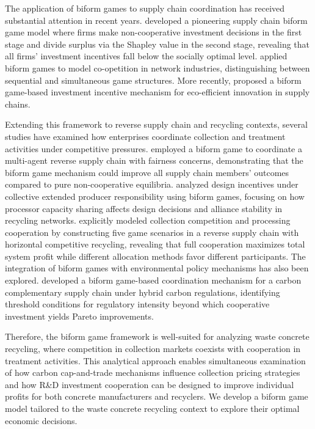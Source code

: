 \documentclass[authoryear,preprint,review,times,10pt]{elsarticle}
\begin{document}
The application of biform games to supply chain coordination has received substantial attention in recent years. \cite{feess2014Surplus} developed a pioneering supply chain biform game model where firms make non-cooperative investment decisions in the first stage and divide surplus via the Shapley value in the second stage, revealing that all firms' investment incentives fall below the socially optimal level. \cite{fiala2022Modelling} applied biform games to model co-opetition in network industries, distinguishing between sequential and simultaneous game structures. More recently, \cite{zheng2023New} proposed a biform game-based investment incentive mechanism for eco-efficient innovation in supply chains.

Extending this framework to reverse supply chain and recycling contexts, several studies have examined how enterprises coordinate collection and treatment activities under competitive pressures. \cite{jia2023Novel} employed a biform game to coordinate a multi-agent reverse supply chain with fairness concerns, demonstrating that the biform game mechanism could improve all supply chain members' outcomes compared to pure non-cooperative equilibria. \cite{gui2018Design} analyzed design incentives under collective extended producer responsibility using biform games, focusing on how processor capacity sharing affects design decisions and alliance stability in recycling networks. \cite{wang2026Integration} explicitly modeled collection competition and processing cooperation by constructing five game scenarios in a reverse supply chain with horizontal competitive recycling, revealing that full cooperation maximizes total system profit while different allocation methods favor different participants. The integration of biform games with environmental policy mechanisms has also been explored. \cite{zheng2024New} developed a biform game-based coordination mechanism for a carbon complementary supply chain under hybrid carbon regulations, identifying threshold conditions for regulatory intensity beyond which cooperative investment yields Pareto improvements.

Therefore, the biform game framework is well-suited for analyzing waste concrete recycling, where competition in collection markets coexists with cooperation in treatment activities. This analytical approach enables simultaneous examination of how carbon cap-and-trade mechanisms influence collection pricing strategies and how R\&D investment cooperation can be designed to improve individual profits for both concrete manufacturers and recyclers. We develop a biform game model tailored to the waste concrete recycling context to explore their optimal economic decisions.
\end{document}
